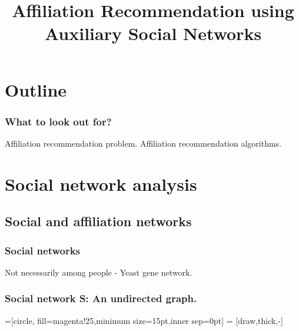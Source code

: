 \documentclass{beamer}
\title{Affiliation Recommendation using Auxiliary Social Networks}
\begin{document}

% 

\frame{\titlepage}
\section{Outline}
\begin{frame}
\frametitle{What to look out for?}
\begin{itemize}
\pitem Affiliation recommendation problem.
\pitem Affiliation recommendation algorithms.
\end{itemize}
\end{frame}

\section{Social network analysis}
\subsection{Social and affiliation networks}
\begin{frame}
\frametitle{Social networks}
\begin{itemize}
\pitem {}
\pitem Not necessarily among people - Yeast gene network.
\end{itemize}
\end{frame}

\begin{frame}
\frametitle{Social network S: An undirected graph.}

=[circle, fill=magenta!25,minimum size=15pt,inner sep=0pt]
 = [draw,thick,-]

\begin{center}
\end{center}
\end{frame}
\end{document}
